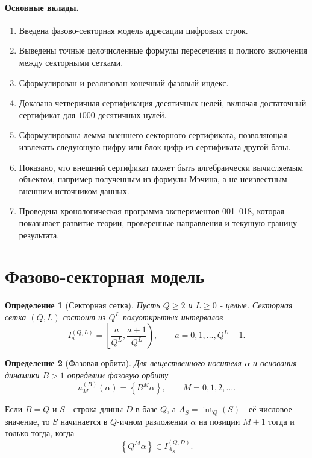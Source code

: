 \documentclass[11pt,a4paper]{article}
\newtheorem{definition}{Определение}
\newcommand{\fracpart}[1]{\left\{#1\right\}}
\begin{document}
\paragraph{Основные вклады.}
\begin{enumerate}[leftmargin=2em]
  \item Введена фазово-секторная модель адресации цифровых строк.
  \item Выведены точные целочисленные формулы пересечения и полного включения между секторными сетками.
  \item Сформулирован и реализован конечный фазовый индекс.
  \item Доказана четверичная сертификация десятичных целей, включая достаточный сертификат для $1000$ десятичных нулей.
  \item Сформулирована лемма внешнего секторного сертификата, позволяющая извлекать следующую цифру или блок цифр из сертификата другой базы.
  \item Показано, что внешний сертификат может быть алгебраически вычисляемым объектом, например полученным из формулы Мэчина, а не неизвестным внешним источником данных.
  \item Проведена хронологическая программа экспериментов 001--018, которая показывает развитие теории, проверенные направления и текущую границу результата.
\end{enumerate}

\section{Фазово-секторная модель}

\begin{definition}[Секторная сетка]
Пусть $Q\ge2$ и $L\ge0$ - целые.  Секторная сетка $(Q,L)$ состоит из $Q^L$ полуоткрытых интервалов
\[
  I_a^{(Q,L)}=\left[\frac{a}{Q^L},\frac{a+1}{Q^L}\right),
  \qquad a=0,1,\dots,Q^L-1.
\]
\end{definition}

\begin{definition}[Фазовая орбита]
Для вещественного носителя $\alpha$ и основания динамики $B>1$ определим фазовую орбиту
\[
  u_M^{(B)}(\alpha)=\fracpart{B^M\alpha},\qquad M=0,1,2,\dots.
\]
\end{definition}

Если $B=Q$ и $S$ - строка длины $D$ в базе $Q$, а $A_S=\operatorname{int}_Q(S)$ - её числовое значение, то $S$ начинается в $Q$-ичном разложении $\alpha$ на позиции $M+1$ тогда и только тогда, когда
\[
  \fracpart{Q^M\alpha}\in I_{A_S}^{(Q,D)}.
\]
\end{document}
